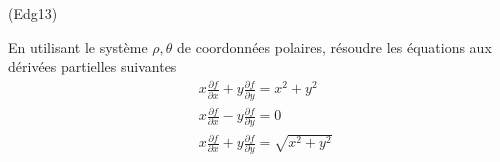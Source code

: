 \begin{tiny}(Edg13)\end{tiny} En utilisant le système $\rho , \theta$ de coordonnées polaires, résoudre les équations aux dérivées partielles suivantes
\begin{align*}
 & x\frac{\partial f}{\partial x} +y\frac{\partial f}{\partial y} = x^2+y^2\\
 & x\frac{\partial f}{\partial x} -y\frac{\partial f}{\partial y} = 0\\
 & x\frac{\partial f}{\partial x} +y\frac{\partial f}{\partial y} = \sqrt{x^2+y^2} 
\end{align*}
 